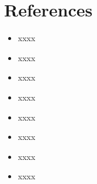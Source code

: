 \documentclass[10pt, conference]{IEEEtran}
\begin{document}
\section*{References}
%

\begin{itemize}
  \item xxxx
  \item xxxx
  \item xxxx
  \item xxxx
  \item xxxx
  \item xxxx
  \item xxxx
  \item xxxx
\end{itemize}

\fi







\end{document}

